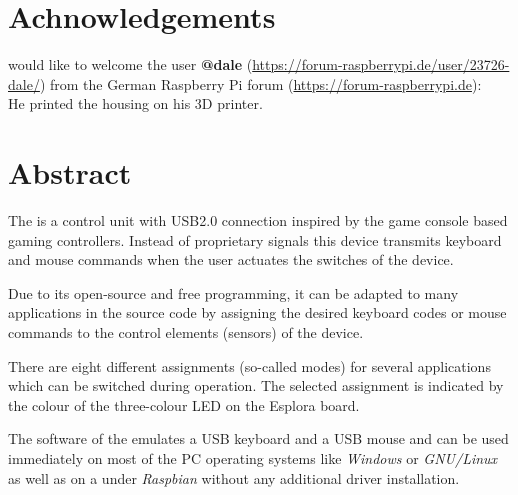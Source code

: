\section{Achnowledgements}
{\autor} would like to welcome the user \textbf{@dale}
(\url{https://forum-raspberrypi.de/user/23726-dale/}) from the German
Raspberry Pi forum (\url{https://forum-raspberrypi.de}):\\
He printed the housing on his 3D printer.

\section{Abstract} %
The {\Bezeichnung} is a control unit with USB2.0 connection inspired by
the game console based gaming controllers. Instead of proprietary
signals this device transmits keyboard and mouse commands when the user
actuates the switches of the device.

Due to its open-source and free programming, it can be adapted to many
applications in the source code by assigning the desired keyboard codes
or mouse commands to the control elements (sensors) of the device.

There are eight different assignments (so-called modes) for several
applications which can be switched during operation. The selected 
assignment is indicated by the colour of the three-colour LED on the
Esplora board.

The software of the {\Bezeichnung} emulates a USB keyboard and a USB
mouse and can be used immediately on most of the PC operating systems
like \textit{Windows} or \textit{GNU/Linux} as well as on a {\RPi} under
\textit{Raspbian} without any additional driver installation.
